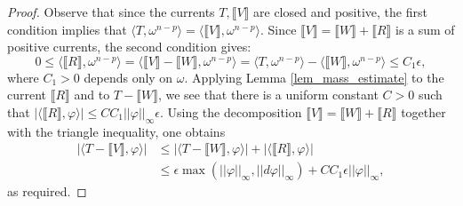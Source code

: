 \documentclass[12pt]{amsbook}%
\theoremstyle{definition}
\theoremstyle{remark}
\numberwithin{section}{chapter}
\numberwithin{subsection}{section}
\numberwithin{figure}{chapter}
\newcommand\intcur[1]{\llbracket #1 \rrbracket}
\begin{document}
{{\begin{proof}
Observe that since the currents $T, \llbracket V\rrbracket$ are closed and positive, the first condition implies that $ \langle T, \omega^{n-p} \rangle = \langle  \llbracket V\rrbracket, \omega^{n-p} \rangle $.
Since $ \llbracket V\rrbracket =  \llbracket W\rrbracket +  \llbracket R\rrbracket$ is a sum of positive currents, the second condition gives: $$ 0 \leqslant \langle  \llbracket R\rrbracket , \omega^{n-p} \rangle = \langle  \llbracket V\rrbracket -  \llbracket W\rrbracket , \omega^{n-p} \rangle = \langle T, \omega^{n-p} \rangle - \langle  \llbracket W\rrbracket, \omega^{n-p} \rangle \leqslant C_1 \epsilon,  $$
where $C_1>0$ depends only on $\omega$. 
Applying Lemma \ref{lem_mass_estimate} to the current $ \llbracket R\rrbracket$ and to $T - \intcur{W}$, we see that there is a uniform constant $C> 0$ such that $| \langle\intcur{R},\varphi \rangle| \leqslant C C_1 ||\varphi||_\infty \epsilon $. Using the decomposition  $\intcur{V} = \intcur{W} + \intcur{R}$ together with the triangle inequality, one obtains 
\begin{align*}
 |\langle T -  \llbracket V\rrbracket, \varphi \rangle| &\leqslant |\langle T-  \llbracket W\rrbracket ,\varphi \rangle | + |\langle \intcur{R} , \varphi \rangle| \\
   & \leqslant  \epsilon \max(||\varphi ||_\infty, ||d\varphi ||_\infty) + C C_1 \epsilon ||\varphi||_\infty,
\end{align*}
as required.
\end{proof} 

}}
\end{document}
